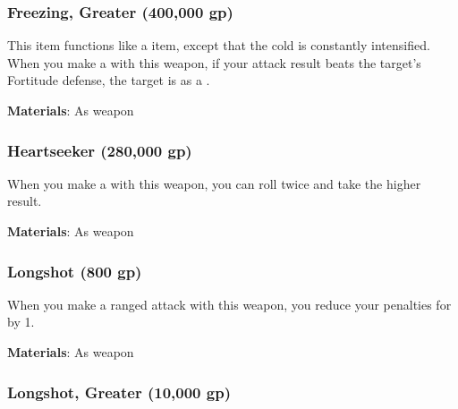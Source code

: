\lowercase{\hypertarget{item:Freezing, Greater}{}}\label{item:Freezing, Greater}
\hypertarget{item:Freezing, Greater}{\subsubsection{Freezing, Greater\hfill{} (400,000 gp)}}

This item functions like a  item, except that the cold is constantly intensified.
When you make a  with this weapon, if your attack result beats the target's Fortitude defense, the target is \chilled as a .



\vspace{0.25em}
\textbf{Materials}: As weapon


\lowercase{\hypertarget{item:Heartseeker}{}}\label{item:Heartseeker}
\hypertarget{item:Heartseeker}{\subsubsection{Heartseeker\hfill{} (280,000 gp)}}

When you make a  with this weapon, you can roll twice and take the higher result.



\vspace{0.25em}
\textbf{Materials}: As weapon


\lowercase{\hypertarget{item:Longshot}{}}\label{item:Longshot}
\hypertarget{item:Longshot}{\subsubsection{Longshot\hfill{} (800 gp)}}

When you make a ranged attack with this weapon, you reduce your penalties for  by 1.



\vspace{0.25em}
\textbf{Materials}: As weapon


\lowercase{\hypertarget{item:Longshot, Greater}{}}\label{item:Longshot, Greater}
\hypertarget{item:Longshot, Greater}{\subsubsection{Longshot, Greater\hfill{} (10,000 gp)}}

